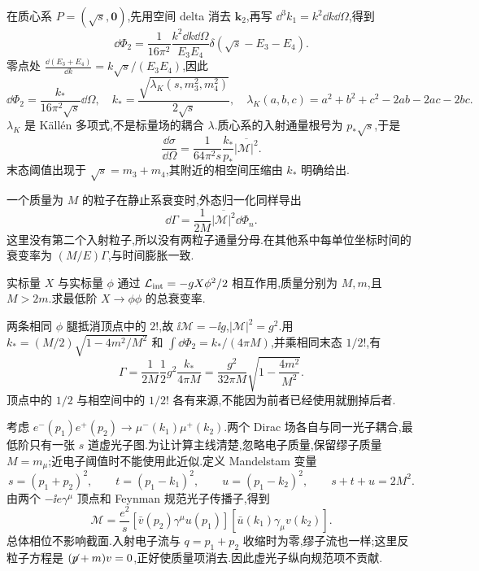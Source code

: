 
在质心系 $P=(\sqrt s,\mathbf0)$,先用空间 delta 消去 $\mathbf k_2$,再写 $\dd^3k_1=k^2\dd k\dd\Omega$,得到
\begin{equation}
 \dd\Phi_2=\frac{1}{16\pi^2}\frac{k^2\dd k\dd\Omega}{E_3E_4}
 \delta(\sqrt s-E_3-E_4).
\end{equation}
零点处 $\frac{\dd(E_3+E_4)}{\dd k}=k\sqrt s/(E_3E_4)$,因此
\begin{equation}
 \dd\Phi_2=\frac{k_*}{16\pi^2\sqrt s}\dd\Omega,
 \quad k_*=\frac{\sqrt{\lambda_K(s,m_3^2,m_4^2)}}{2\sqrt s},
 \quad \lambda_K(a,b,c)=a^2+b^2+c^2-2ab-2ac-2bc.
 \label{eq:two-body-phase}
\end{equation}
$\lambda_K$ 是 Källén 多项式,不是标量场的耦合 $\lambda$.质心系的入射通量根号为 $p_*\sqrt s$,于是
\begin{equation}
 \frac{\dd\sigma}{\dd\Omega}
 =\frac{1}{64\pi^2s}\frac{k_*}{p_*}\overline{|\mathcal M|^2}.
 \label{eq:two-body-cross}
\end{equation}
末态阈值出现于 $\sqrt s=m_3+m_4$,其附近的相空间压缩由 $k_*$ 明确给出.

一个质量为 $M$ 的粒子在静止系衰变时,外态归一化同样导出
\begin{equation}
 \dd\Gamma=\frac{1}{2M}\overline{|\mathcal M|^2}\dd\Phi_n.
\end{equation}
这里没有第二个入射粒子,所以没有两粒子通量分母.在其他系中每单位坐标时间的衰变率为 $(M/E)\Gamma$,与时间膨胀一致.

\begin{example}
实标量 $X$ 与实标量 $\phi$ 通过 $\Lag_{\rm int}=-gX\phi^2/2$ 相互作用,质量分别为 $M,m$,且 $M>2m$.求最低阶 $X\to\phi\phi$ 的总衰变率.
\end{example}
\begin{solution}
两条相同 $\phi$ 腿抵消顶点中的 $2!$,故 $\ii\mathcal M=-\ii g$,$|\mathcal M|^2=g^2$.用 $k_*=(M/2)\sqrt{1-4m^2/M^2}$ 和 $\int\dd\Phi_2=k_*/(4\pi M)$,并乘相同末态 $1/2!$,有
\[
 \Gamma=\frac1{2M}\frac12 g^2\frac{k_*}{4\pi M}
 =\frac{g^2}{32\pi M}\sqrt{1-\frac{4m^2}{M^2}}.
\]
顶点中的 $1/2$ 与相空间中的 $1/2!$ 各有来源,不能因为前者已经使用就删掉后者.
\end{solution}


考虑 $e^-(p_1)e^+(p_2)\to\mu^-(k_1)\mu^+(k_2)$.两个 Dirac 场各自与同一光子耦合,最低阶只有一张 $s$ 道虚光子图.为让计算主线清楚,忽略电子质量,保留缪子质量 $M=m_\mu$;近电子阈值时不能使用此近似.定义 Mandelstam 变量
\begin{equation}
 s=(p_1+p_2)^2,\qquad t=(p_1-k_1)^2,
 \qquad u=(p_1-k_2)^2,
 \qquad s+t+u=2M^2.
\end{equation}
由两个 $-\ii e\gamma^\mu$ 顶点和 Feynman 规范光子传播子,得到
\begin{equation}
 \mathcal M=\frac{e^2}{s}
 [\bar v(p_2)\gamma^\mu u(p_1)]
 [\bar u(k_1)\gamma_\mu v(k_2)].
 \label{eq:ee-mumu-amplitude}
\end{equation}
总体相位不影响截面.入射电子流与 $q=p_1+p_2$ 收缩时为零,缪子流也一样;这里反粒子方程是 $(\slashed p+m)v=0$,正好使质量项消去.因此虚光子纵向规范项不贡献.

